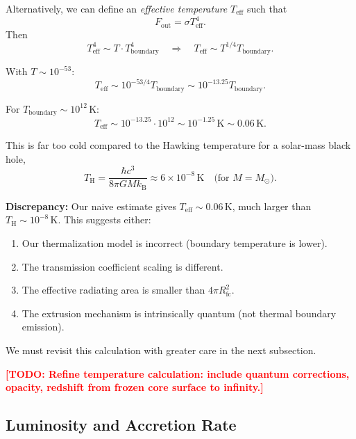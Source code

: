 \documentclass[12pt,a4paper]{article}
\newcommand{\TODO}[1]{\textcolor{red}{\textbf{[TODO: #1]}}}
\newcommand{\Rfc}{R_\text{fc}}
\newcommand{\TH}{T_\text{H}}
\theoremstyle{definition}
\begin{document}
Alternatively, we can define an \emph{effective temperature} $T_\text{eff}$ such that
\begin{equation}
F_\text{out} = \sigma T_\text{eff}^4.
\end{equation}
Then
\begin{equation}
T_\text{eff}^4 \sim T \cdot T_\text{boundary}^4 \quad \Rightarrow \quad T_\text{eff} \sim T^{1/4} T_\text{boundary}.
\label{eq:T_eff}
\end{equation}

With $T \sim 10^{-53}$:
\begin{equation}
T_\text{eff} \sim 10^{-53/4} T_\text{boundary} \sim 10^{-13.25} T_\text{boundary}.
\label{eq:T_eff_order}
\end{equation}

For $T_\text{boundary} \sim 10^{12}\,\text{K}$:
\begin{equation}
T_\text{eff} \sim 10^{-13.25} \cdot 10^{12} \sim 10^{-1.25}\,\text{K} \sim 0.06\,\text{K}.
\label{eq:T_eff_solar}
\end{equation}

This is far too cold compared to the Hawking temperature for a solar-mass black hole,
\begin{equation}
\TH = \frac{\hbar c^3}{8\pi G M k_\text{B}} \approx 6 \times 10^{-8}\,\text{K} \quad \text{(for } M = M_\odot\text{)}.
\label{eq:T_Hawking_solar}
\end{equation}

\textbf{Discrepancy:} Our naive estimate gives $T_\text{eff} \sim 0.06\,\text{K}$, much larger than $\TH \sim 10^{-8}\,\text{K}$. This suggests either:
\begin{enumerate}
  \item Our thermalization model is incorrect (boundary temperature is lower).
  \item The transmission coefficient scaling is different.
  \item The effective radiating area is smaller than $4\pi \Rfc^2$.
  \item The extrusion mechanism is intrinsically quantum (not thermal boundary emission).
\end{enumerate}

We must revisit this calculation with greater care in the next subsection.

\TODO{Refine temperature calculation: include quantum corrections, opacity, redshift from frozen core surface to infinity.}

\subsection{Luminosity and Accretion Rate}
\label{subsec:luminosity}
\end{document}

